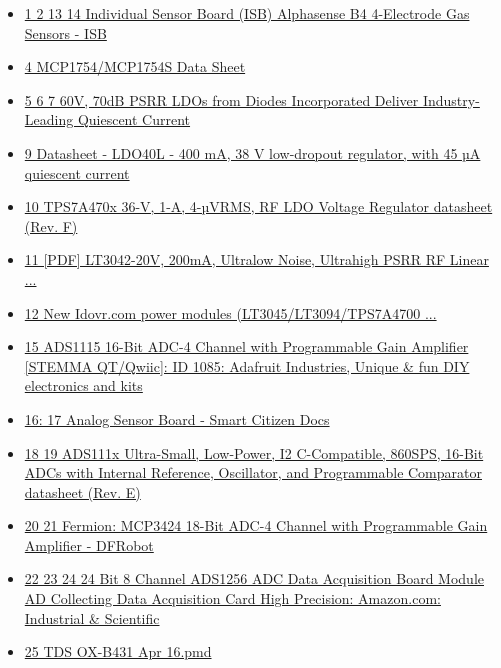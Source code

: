 \documentclass[a4paper, 12pt]{article}
\begin{document}
\begin{itemize}
    \item \href{https://www.isweek.com/product/individual-sensor-board-isb-alphasense-b4-4-electrode-gas-sensors-isb_51.html}{1 2 13 14 Individual Sensor Board (ISB) Alphasense B4 4-Electrode Gas Sensors - ISB}
    \item \href{https://ww1.microchip.com/downloads/aemDocuments/documents/APID/ProductDocuments/DataSheets/MCP1754-and-MCP17545-Data-Sheet-DS20002276.pdf}{4 MCP1754/MCP1754S Data Sheet}
    \item \href{https://www.diodes.com/about/news/press-releases/60v-70db-psrr-Idos-from-diodes-incorporated-deliver-industry-leading-quiescerit-current}{5 6 7 60V, 70dB PSRR LDOs from Diodes Incorporated Deliver Industry-Leading Quiescent Current}
    \item \href{https://www.st.com/resource/en/datasheet/Ido40l.pdf}{9 Datasheet - LDO40L - 400 mA, 38 V low-dropout regulator, with 45 µA quiescent current}
    \item \href{https://www.ti.com/lit/gpn/TPS7A47}{10 TPS7A470x 36-V, 1-A, 4-µVRMS, RF LDO Voltage Regulator datasheet (Rev. F)}
    \item \href{https://www.analog.com/media/en/technical-documentation/data-sheets/3042fb.pdf}{11 [PDF] LT3042-20V, 200mA, Ultralow Noise, Ultrahigh PSRR RF Linear ...}
    \item \href{https://www.diyaudio.com/community/threads/new-Idovr-com-power-modules-it3045-lt3094-tps7a4700-tps7a3301.381199/}{12 New Idovr.com power modules (LT3045/LT3094/TPS7A4700 ...}
    \item \href{https://www.adafruit.com/product/1085?srsltid=AfmBOopx0wbvB1RWUhtVSYuXBsSMYawmOMs_8VuhxXXwaKvWz0Q7wUeQ}{15 ADS1115 16-Bit ADC-4 Channel with Programmable Gain Amplifier [STEMMA QT/Qwiic]: ID 1085: Adafruit Industries, Unique \& fun DIY electronics and kits}
    \item \href{https://docs.smartcitizen.me/hardware/boards/analog-sensor-board/}{16: 17 Analog Sensor Board - Smart Citizen Docs}
    \item \href{https://www.ti.com/lit/ds/symlink/ads1115.pdf}{18 19 ADS111x Ultra-Small, Low-Power, I2 C-Compatible, 860SPS, 16-Bit ADCs with Internal Reference, Oscillator, and Programmable Comparator datasheet (Rev. E)}
    \item \href{https://www.dfrobot.com/product-1182.html?srsltid=AfmBOoqQvFr-aAvIAWsH3YGbETrjZec9XZqxHzjl9ZRzbmjEL9ZKml76}{20 21 Fermion: MCP3424 18-Bit ADC-4 Channel with Programmable Gain Amplifier - DFRobot}
    \item \href{https://www.amazon.com/Channel-ADS1256-Acquisition-Collecting-Precision/dp/B0DBSWRQZS}{22 23 24 24 Bit 8 Channel ADS1256 ADC Data Acquisition Board Module AD Collecting Data Acquisition Card High Precision: Amazon.com: Industrial \& Scientific}
    \item \href{https://www.isweek.com/Uploads/20161216/5853470876f70.pdf}{25 TDS OX-B431 Apr 16.pmd}
\end{itemize}
\end{document}
